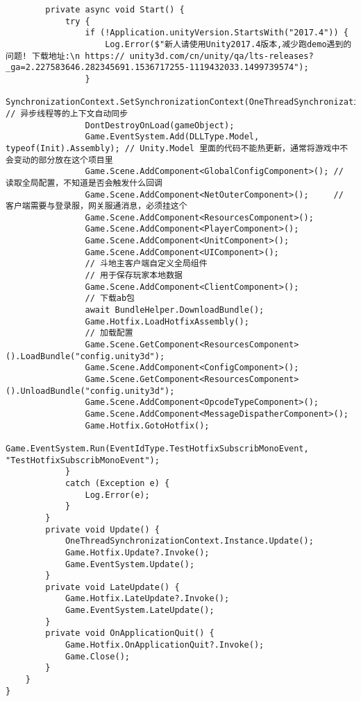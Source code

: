 \documentclass[9pt, b5paper]{article}
\begin{document}
\begin{verbatim}
        private async void Start() {
            try { 
                if (!Application.unityVersion.StartsWith("2017.4")) {
                    Log.Error($"新人请使用Unity2017.4版本,减少跑demo遇到的问题! 下载地址:\n https:// unity3d.com/cn/unity/qa/lts-releases?_ga=2.227583646.282345691.1536717255-1119432033.1499739574");
                }
                SynchronizationContext.SetSynchronizationContext(OneThreadSynchronizationContext.Instance); // 异步线程等的上下文自动同步
                DontDestroyOnLoad(gameObject);
                Game.EventSystem.Add(DLLType.Model, typeof(Init).Assembly); // Unity.Model 里面的代码不能热更新，通常将游戏中不会变动的部分放在这个项目里
                Game.Scene.AddComponent<GlobalConfigComponent>(); // 读取全局配置，不知道是否会触发什么回调
                Game.Scene.AddComponent<NetOuterComponent>();     // 客户端需要与登录服，网关服通消息，必须挂这个
                Game.Scene.AddComponent<ResourcesComponent>();
                Game.Scene.AddComponent<PlayerComponent>();
                Game.Scene.AddComponent<UnitComponent>();
                Game.Scene.AddComponent<UIComponent>();
                // 斗地主客户端自定义全局组件
                // 用于保存玩家本地数据
                Game.Scene.AddComponent<ClientComponent>();
                // 下载ab包
                await BundleHelper.DownloadBundle();
                Game.Hotfix.LoadHotfixAssembly();
                // 加载配置
                Game.Scene.GetComponent<ResourcesComponent>().LoadBundle("config.unity3d");
                Game.Scene.AddComponent<ConfigComponent>();
                Game.Scene.GetComponent<ResourcesComponent>().UnloadBundle("config.unity3d");
                Game.Scene.AddComponent<OpcodeTypeComponent>();
                Game.Scene.AddComponent<MessageDispatherComponent>();
                Game.Hotfix.GotoHotfix();
                Game.EventSystem.Run(EventIdType.TestHotfixSubscribMonoEvent, "TestHotfixSubscribMonoEvent");
            }
            catch (Exception e) {
                Log.Error(e);
            }
        }
        private void Update() {
            OneThreadSynchronizationContext.Instance.Update();
            Game.Hotfix.Update?.Invoke();
            Game.EventSystem.Update();
        }
        private void LateUpdate() {
            Game.Hotfix.LateUpdate?.Invoke();
            Game.EventSystem.LateUpdate();
        }
        private void OnApplicationQuit() {
            Game.Hotfix.OnApplicationQuit?.Invoke();
            Game.Close();
        }
    }
}
\end{verbatim}
\end{document}
